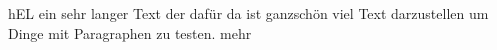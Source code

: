 \documentclass[11pt]{article}
\begin{document}
\pagestyle{fancy} %
\fancyhf{} %



\fancyfoot{} %
\fancyfoot[C]{
    \hfill \break{}
    \thepage{}
}

hEL ein sehr langer Text der dafür da ist ganzschön viel Text darzustellen um Dinge mit Paragraphen zu testen.
mehr
\end{document}
